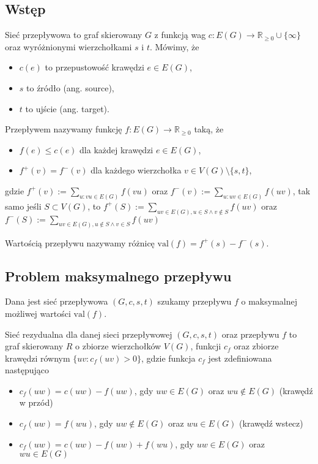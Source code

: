 \subsection{Wstęp}
\begin{defi}
	Sieć przepływowa to graf skierowany $G$
	z funkcją wag $c: E(G) \to 
	\mathbb{R}_{\geq 0} \cup \{\infty\}$ oraz
	wyróżnionymi wierzchołkami $s$ i $t$. Mówimy, że
	\begin{itemize}
		\item $c(e)$ to przepustowość krawędzi $e \in E(G)$,
		\item $s$ to źródło (ang. source),
		\item $t$ to ujście (ang. target).
	\end{itemize}
\end{defi}

\begin{defi}
	Przepływem nazywamy funkcję $f: E(G) \to \mathbb{R}_{\geq 0}$ 
	taką, że 
	\begin{itemize}
		\item $f(e) \leq c(e)$ dla każdej krawędzi $e\in E(G)$,
		\item $f^+(v) = f^-(v)$ dla każdego wierzchołka $v \in V(G) \setminus \{s, t\}$,
	\end{itemize}
	gdzie $f^+(v) := \sum\limits_{u:vu \in E(G)} f(vu)$ oraz $f^-(v) := \sum\limits_{u:uv \in E(G)} f(uv)$,
	tak samo jeśli $S \subset V(G)$, to $f^+(S) := \sum\limits_{uv \in E(G), u\in S \land v \not \in S  } f(uv)$ oraz 
	$f^-(S) := \sum\limits_{uv \in E(G), u\not \in S \land v \in S  } f(uv)$
\end{defi}

\begin{defi}
	Wartością przepływu nazywamy różnicę 
	$\text{val}(f)=f^+(s)-f^-(s)$.
\end{defi}

\subsection{Problem maksymalnego przepływu}
Dana jest sieć przepływowa $(G, c, s, t)$ szukamy przepływu $f$
o maksymalnej możliwej wartości $\text{val}(f)$. 

\begin{defi}
	Sieć rezydualna dla danej sieci przepływowej $(G, c, s, t)$
	oraz przepływu $f$ to graf skierowany $R$ o zbiorze
	wierzchołków $V(G)$, funkcji $c_f$ oraz zbiorze krawędzi
	równym $\{uv : c_f(uv) > 0\}$, gdzie funkcja $c_f$ jest 
	zdefiniowana następująco
	\begin{itemize}
		\item $c_f(uw) = c(uw) - f(uw)$, gdy $uw \in E(G)$ oraz $wu \not \in E(G)$ (krawędź w przód)
		\item $c_f(uw) = f(wu)$, gdy $uw \not \in E(G)$ oraz $wu \in E(G)$ (krawędź wstecz)
		\item $c_f(uw) = c(uw) - f(uw) + f(wu)$, gdy 
		$uw \in E(G)$ oraz $wu \in E(G)$
	\end{itemize}
\end{defi}

